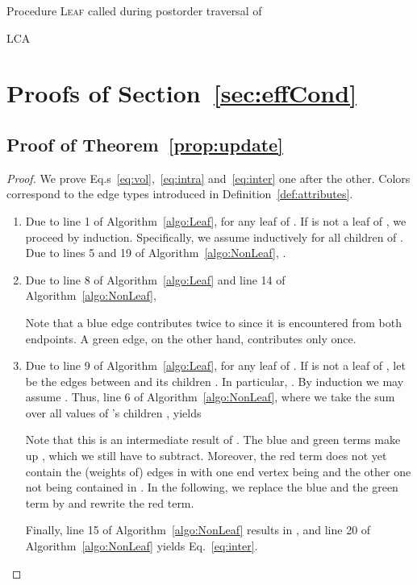 \documentclass[pdftex]{llncs}
\numberwithin{equation}{section}
\numberwithin{example}{section}
\numberwithin{table}{section}
\begin{document}
\begin{algorithm}[h!]
\caption{Procedure \textsc{Leaf} called during postorder traversal of }
\label{algo:Leaf}
\begin{algorithmic}[1]
\State 
\State 
\ForAll{}
  \If{}
    \State 
  \Else
    \State \textsc{LCA}
    \State 
    \State 
  \EndIf
\EndFor
\If{} \State

\EndIf
\end{algorithmic}
\end{algorithm}

\section{Proofs of Section~\ref{sec:effCond}}
\label{sec:proofs-apx}
\subsection{Proof of Theorem~\ref{prop:update}}
\begin{proof}
  We prove Eq.s~\ref{eq:vol},~\ref{eq:intra} and~\ref{eq:inter} one
  after the other. Colors correspond to the edge types introduced in
  Definition~\ref{def:attributes}.
\begin{enumerate}
\item Due to line 1 of Algorithm~\ref{algo:Leaf},  for any leaf  of . If  is not a
  leaf of , we proceed by induction. Specifically, we assume inductively
   for all children  of . Due to
  lines 5 and 19 of Algorithm~\ref{algo:NonLeaf}, .
\item Due to line 8 of Algorithm~\ref{algo:Leaf} and line 14 of
  Algorithm~\ref{algo:NonLeaf},



Note that a blue edge contributes twice to  since it
is encountered from both endpoints. A green edge, on the other hand,
contributes only once.
\item Due to line 9 of Algorithm~\ref{algo:Leaf},  for any leaf  of . If  is
  not a leaf of , let  be the edges between 
  and its children . In particular, . By induction
  we may assume . Thus, line 6 of Algorithm~\ref{algo:NonLeaf}, where we
  take the sum over all  values of 's children ,
  yields



Note that this is an intermediate result of . The blue
and green terms make up , which we still have to
subtract. Moreover, the red term does not yet contain the (weights of)
edges in  with one end vertex being  and the other one not being
contained in . In the following, we replace the blue and the
green term by  and rewrite the red term.



Finally, line 15 of Algorithm~\ref{algo:NonLeaf} results in
,
and line 20 of Algorithm~\ref{algo:NonLeaf} yields
Eq.~\ref{eq:inter}.
\end{enumerate}

\end{proof}
\end{document}
